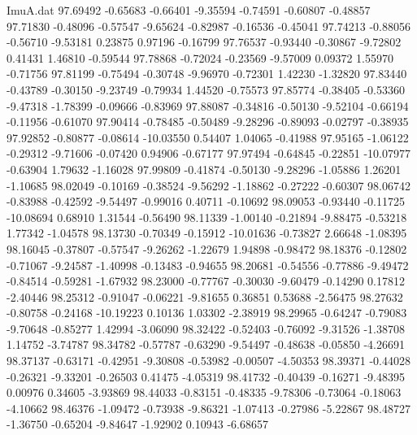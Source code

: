 \begin{filecontents}{ImuA.dat}
  97.69492   -0.65683   -0.66401   -9.35594   -0.74591   -0.60807   -0.48857
  97.71830   -0.48096   -0.57547   -9.65624   -0.82987   -0.16536   -0.45041
  97.74213   -0.88056   -0.56710   -9.53181    0.23875    0.97196   -0.16799
  97.76537   -0.93440   -0.30867   -9.72802    0.41431    1.46810   -0.59544
  97.78868   -0.72024   -0.23569   -9.57009    0.09372    1.55970   -0.71756
  97.81199   -0.75494   -0.30748   -9.96970   -0.72301    1.42230   -1.32820
  97.83440   -0.43789   -0.30150   -9.23749   -0.79934    1.44520   -0.75573
  97.85774   -0.38405   -0.53360   -9.47318   -1.78399   -0.09666   -0.83969
  97.88087   -0.34816   -0.50130   -9.52104   -0.66194   -0.11956   -0.61070
  97.90414   -0.78485   -0.50489   -9.28296   -0.89093   -0.02797   -0.38935
  97.92852   -0.80877   -0.08614  -10.03550    0.54407    1.04065   -0.41988
  97.95165   -1.06122   -0.29312   -9.71606   -0.07420    0.94906   -0.67177
  97.97494   -0.64845   -0.22851  -10.07977   -0.63904    1.79632   -1.16028
  97.99809   -0.41874   -0.50130   -9.28296   -1.05886    1.26201   -1.10685
  98.02049   -0.10169   -0.38524   -9.56292   -1.18862   -0.27222   -0.60307
  98.06742   -0.83988   -0.42592   -9.54497   -0.99016    0.40711   -0.10692
  98.09053   -0.93440   -0.11725  -10.08694    0.68910    1.31544   -0.56490
  98.11339   -1.00140   -0.21894   -9.88475   -0.53218    1.77342   -1.04578
  98.13730   -0.70349   -0.15912  -10.01636   -0.73827    2.66648   -1.08395
  98.16045   -0.37807   -0.57547   -9.26262   -1.22679    1.94898   -0.98472
  98.18376   -0.12802   -0.71067   -9.24587   -1.40998   -0.13483   -0.94655
  98.20681   -0.54556   -0.77886   -9.49472   -0.84514   -0.59281   -1.67932
  98.23000   -0.77767   -0.30030   -9.60479   -0.14290    0.17812   -2.40446
  98.25312   -0.91047   -0.06221   -9.81655    0.36851    0.53688   -2.56475
  98.27632   -0.80758   -0.24168  -10.19223    0.10136    1.03302   -2.38919
  98.29965   -0.64247   -0.79083   -9.70648   -0.85277    1.42994   -3.06090
  98.32422   -0.52403   -0.76092   -9.31526   -1.38708    1.14752   -3.74787
  98.34782   -0.57787   -0.63290   -9.54497   -0.48638   -0.05850   -4.26691
  98.37137   -0.63171   -0.42951   -9.30808   -0.53982   -0.00507   -4.50353
  98.39371   -0.44028   -0.26321   -9.33201   -0.26503    0.41475   -4.05319
  98.41732   -0.40439   -0.16271   -9.48395    0.00976    0.34605   -3.93869
  98.44033   -0.83151   -0.48335   -9.78306   -0.73064   -0.18063   -4.10662
  98.46376   -1.09472   -0.73938   -9.86321   -1.07413   -0.27986   -5.22867
  98.48727   -1.36750   -0.65204   -9.84647   -1.92902    0.10943   -6.68657

\end{filecontents}
